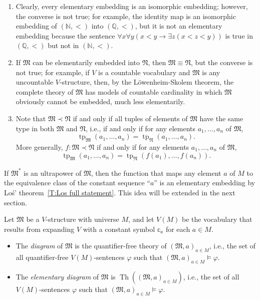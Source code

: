 \documentclass{scrartcl}
\DeclareMathOperator{\Th}{Th}
\DeclareMathOperator{\tp}{tp}
\renewcommand{\phi}{\varphi}
\newcommand{\FM}{\mathfrak{M}}
\newcommand{\FN}{\mathfrak{N}}
\begin{document}
\begin{remarks}
\hfill
\begin{enumerate}

\item
Clearly, every elementary embedding is an isomorphic embedding; however, the converse is not true; for example,  the identity map is an isomorphic embedding of $(\mathbb{N}, <)$ into  $(\mathbb{Q},<)$, but it is not an elementary embedding because the sentence $\forall x\forall y (x<y \to \exists z (x<z<y))$ is true in $(\mathbb{Q}, <)$ but not in $(\mathbb{N},<)$.
\item
If $\FM$ can be elementarily embedded into $\FN$, then $\FM\equiv \FN$, but the converse is not true; for example, if $V$ is a countable vocabulary and $\FM$ is any uncountable $V$-structure, then, by the Löwenheim-Skolem theorem, the complete theory of $\FM$ has models of countable cardinality in which $\FM$ obviously cannot be embedded, much less elementarily.

\item
Note that $\mathfrak{M}\prec\mathfrak{N}$ if and only if all tuples of elements of $\FM$ have the same type in both $\FM$ and $\FN$, i.e., if and only if  for any elements $a_1,\dots, a_n$ of $\mathfrak{M}$, 
\[
\tp_\mathfrak{M}(a_1,\dots, a_n)= \tp_\mathfrak{N}(a_1,\dots, a_n).
\] 
More generally, $f:\mathfrak{M}\prec\mathfrak{N}$ if and only if for any elements $a_1,\dots, a_n$ of $\mathfrak{M}$, 
\[
\tp_\mathfrak{M}(a_1,\dots, a_n)= \tp_\mathfrak{N}(f(a_1),\dots, f(a_n)).
\]
\end{enumerate}
\end{remarks}

\begin{example}
\label{E:Los embedding}
If $\FM^*$ is an ultrapower of $\FM$, then the function that maps any element $a$ of $M$ to the equivalence class of the constant sequence ``$a$'' is an elementary embedding by Loś' theorem~\ref{T:Los full statement}. This idea will be extended in the next section.
\end{example}

\begin{definition}
Let $\FM$ be a $V$-structure with universe $M$, and let $V(M)$ be the vocabulary that results from expanding $V$ with a constant symbol $\mathbb{c}_a$ for each $a\in M$.


\begin{itemize}
\item
The \emph{diagram} of $\FM$ is the quantifier-free theory of $(\FM,a)_{a\in M}$, i.e., the set of all quantifier-free $V(M)$-sentences $\phi$ such that $(\FM,a)_{a\in M}\models\phi$.
\item
The \emph{elementary diagram} of $\FM$ is  $\Th((\FM,a)_{a\in M})$, i.e., the set of all $V(M)$-sentences $\phi$ such that $(\FM,a)_{a\in M}\models \phi$.

\end{itemize}

\end{definition}
\end{document}
